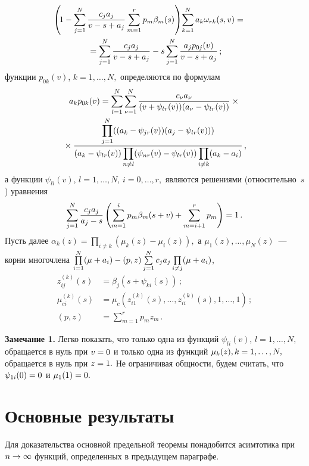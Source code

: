 \begin{multicols}{2}
\noindent
\begin{multline}
\hspace*{-12pt}\left(\!1-\sum\limits_{j=1}^N\fr{c_ja_j}{v-s+a_j}\sum\limits_{m=1}^rp_m
\beta_m(s)\right)\!
\sum\limits_{k=1}^N a_k \omega_{rk}(s,v)={}\\
{}=
\sum\limits_{j=1}^N\fr{c_ja_j}{v-s+a_j}-s\sum\limits_{j=1}^N\fr{a_jp_{0j}(v)}{v-s+a_j}\,;
\label{5}
\end{multline}
функции $p_{0k}(v)$, $k=1,\ldots,N,$ определяются по формулам
\begin{multline*}
a_k p_{0k}(v)=\sum\limits_{l=1}^N\sum\limits_{\nu=1}^N\displaystyle\frac{\displaystyle c_{\nu}a_{\nu}\mathstrut}{\displaystyle (v+\psi_{lr}(v))(a_{\nu}-\psi_{lr}(v))\mathstrut}\times{}\\
{}\times
\displaystyle\frac{\displaystyle \prod\limits_{j=1}^N((a_k-\psi_{jr}(v))(a_j-\psi_{lr}(v)))\mathstrut}{\displaystyle (a_k-\psi_{lr}(v))
\prod\limits_{n\ne l}(\psi_{nr}(v)-\psi_{lr}(v))
\prod\limits_{i\ne k}(a_k-a_i)\mathstrut}\,,
\end{multline*}
а функции $\psi_{li}(v)$, $l=1,\ldots,N$, $i=0,\ldots,r,$ являются решениями 
(относительно~$s$) уравнения
\begin{equation*}
\sum\limits_{j=1}^N\displaystyle\frac{\displaystyle c_ja_j\mathstrut}{\displaystyle a_j-s\mathstrut}\left(\sum\limits_{m=1}^ip_m\beta_m(s+v)+
\sum\limits_{m=i+1}^rp_m\right)=1\,.
\end{equation*}
Пусть далее
$\alpha_k(z)=\prod\limits_{i\ne k}(\mu_k(z)-\mu_i(z)),$ а $\mu_1(z),\ldots,\mu_N(z)$~--- 
корни многочлена
$
\prod\limits_{i=1}^N(\mu+a_i)\hm-(p,z) \sum\limits_{j=1}^Nc_ja_j\prod\limits_{i\ne j}(\mu+a_i)$,
\begin{align*}
z_{ij}^{(k)}(s)&=\beta_j(s+\psi_{ki}(s))\,;\\
\mu_{ci}^{(k)}(s)&=\mu_c(z_{i1}^{(k)}(s),\ldots,z_{ii}^{(k)}(s),1,\ldots,1)\,;\\
(p,z)&=\sum\limits_{m=1}^rp_m z_m\,.
\end{align*}

\smallskip

\noindent
\textbf{Замечание 1.} 
Легко показать, что только одна из функций $\psi_{li}(v)$, $l=1,\ldots,N,$ 
обращается в нуль при $v\hm=0$ и только одна
из функций $\mu_k(z),k\hm=1,\ldots,N,$ обращается в нуль при $z\hm=1.$ Не ограничивая
общности, будем считать, что $\psi_{1i}(0)\hm=0$ и $\mu_1(1)\hm=0.$

\section{Основные результаты}

Для доказательства основной предельной теоремы понадобится
асимтотика при $n \hm\rightarrow \infty$ функций, определенных в
предыдущем параграфе.


\end{multicols}
